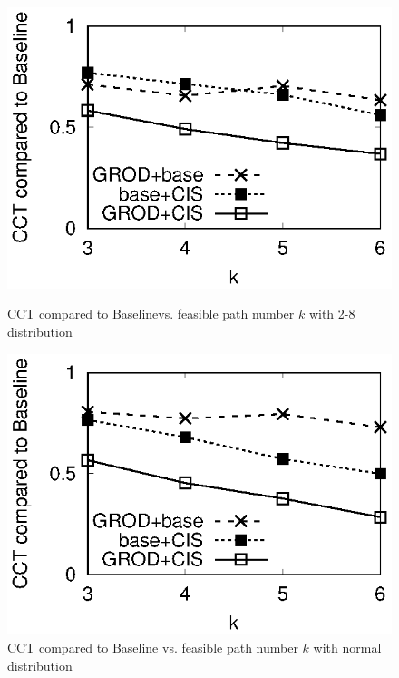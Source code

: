 \begin{figure}
\centering
\begin{minipage}[c]{0.23\textwidth}
\centering

\includegraphics[width=1\textwidth]{28_k_cct.eps}
\caption{CCT compared to Baselinevs. feasible path number $k$ with 2-8 distribution}\label{fig:28_k_cct}
\end{minipage}
\hspace{1mm}
\begin{minipage}[c]{0.23\textwidth}
\centering

\includegraphics[width=1\textwidth]{normal_k_cct.eps}
\caption{CCT compared to Baseline vs. feasible path number $k$ with normal distribution}\label{fig:normal_k_cct}
\end{minipage}
\hspace{1mm}
\begin{minipage}[c]{0.23\textwidth}
\centering


\end{minipage}
\end{figure}
